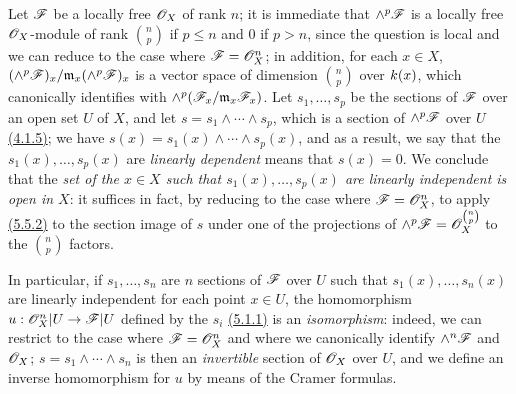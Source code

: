 \begin{env}[5.5.4]
\label{env-0.5.5.4}
Let $\mathscr{F}$ be a locally free $\mathscr{O}_X$ of rank $n$; it is immediate that $\wedge^p\mathscr{F}$ is
a locally free $\mathscr{O}_X$-module of rank $\binom{n}{p}$ if $p\leqslant n$ and $0$ if
$p>n$, since the question is local and we can reduce to the case where $\mathscr{F}=\mathscr{O}_X^n$;
in addition, for each $x\in X$, $(\wedge^p\mathscr{F})_x/\mathfrak{m}_x(\wedge^p\mathscr{F})_x$ is a
vector space of dimension $\binom{n}{p}$ over $k(x)$, which canonically identifies with
$\wedge^p(\mathscr{F}_x/\mathfrak{m}_x\mathscr{F}_x)$. Let $s_1,\dots,s_p$ be the sections of $\mathscr{F}$
over an open set $U$ of $X$, and let $s=s_1\wedge\cdots\wedge s_p$, which is a section of
$\wedge^p\mathscr{F}$ over $U$ \hyperref[env-0.4.1.5]{(4.1.5)}; we have $s(x)=s_1(x)\wedge\cdots\wedge s_p(x)$,
and as a result, we say that the $s_1(x),\dots,s_p(x)$ are {\em linearly dependent} means
that $s(x)=0$. We conclude that the {\em set of the $x\in X$ such that $s_1(x),\dots,s_p(x)$
are linearly independent is open in $X$}: it suffices in fact, by reducing to the case where
$\mathscr{F}=\mathscr{O}_X^n$, to apply \hyperref[env-0.5.5.2]{(5.5.2)} to the section image of $s$ under one of the
projections of $\wedge^p\mathscr{F}=\mathscr{O}_X^{\binom{n}{p}}$ to the $\binom{n}{p}$ factors.

In particular, if $s_1,\dots,s_n$ are $n$ sections of $\mathscr{F}$ over $U$ such that
$s_1(x),\dots,s_n(x)$ are linearly independent for each point $x\in U$, the homomorphism
$u:\mathscr{O}_X^n|U\to\mathscr{F}|U$ defined by the $s_i$ \hyperref[env-0.5.1.1]{(5.1.1)} is an {\em isomorphism}:
indeed, we can restrict to the case where $\mathscr{F}=\mathscr{O}_X^n$ and where we canonically identify
$\wedge^n\mathscr{F}$ and $\mathscr{O}_X$; $s=s_1\wedge\cdots\wedge s_n$ is then an {\em invertible}
section of $\mathscr{O}_X$ over $U$, and we define an inverse homomorphism for $u$ by means of the
Cramer formulas.
\end{env}

